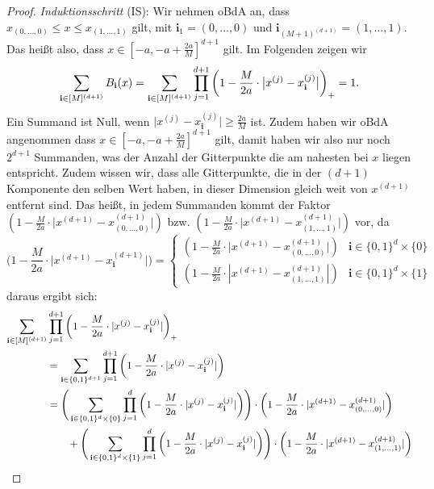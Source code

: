 \begin{proof}
\emph{Induktionsschritt} (IS): Wir nehmen oBdA an, dass $x_{(0,\dots,0)} \leq x \leq x_{(1,\dots,1)}$ gilt, mit $\mathbf{i}_1 = (0,\dots,0)$ und $\mathbf{i}_{(M + 1)^{(d + 1)}} = (1,\dots,1).$ Das heißt also, dass $x \in [-a, -a + \frac{2a}{M}]^{d + 1}$ gilt. Im Folgenden zeigen wir $$\sum_{\mathbf{i} \in [M]^{(d + 1)}} B_{\mathbf{i}}(x) = \sum_{\mathbf{i} \in [M]^{(d + 1)}}\prod_{j = 1}^{d + 1} \bigg(1 - \frac{M}{2a} \cdot \big|x^{(j)} - x_{\mathbf{i}}^{(j)}\big|\bigg)_+ = 1.$$
Ein Summand ist Null, wenn $\big|x^{(j)} - x_{\mathbf{i}}^{(j)}\big| \geq \frac{2a}{M}$ ist. Zudem haben wir oBdA angenommen dass $x \in [-a, -a + \frac{2a}{M}]^{d + 1}$ gilt, damit haben wir also nur noch $2^{d + 1}$ Summanden, was der Anzahl der Gitterpunkte die am nahesten bei $x$ liegen entspricht. Zudem wissen wir, dass alle Gitterpunkte, die in der $(d + 1)$ Komponente den selben Wert haben, in dieser Dimension gleich weit von $x^{(d + 1)}$ entfernt sind. Das heißt, in jedem Summanden kommt der Faktor $(1 - \frac{M}{2a} \cdot \big|x^{(d + 1)} - x_{(0,\dots,0)}^{(d + 1)}\big|)$ bzw. $(1 - \frac{M}{2a} \cdot \big|x^{(d + 1)} - x_{(1,\dots,1)}^{(d + 1)}\big|)$ vor, da 
\begin{equation*}
\bigg(1 - \frac{M}{2a} \cdot \Big|x^{(d + 1)} - x_\mathbf{i}^{(d + 1)}\Big|\bigg) = \begin{cases}
(1 - \frac{M}{2a} \cdot \big|x^{(d + 1)} - x_{(0,\dots,0)}^{(d + 1)}\big|) &\text{$\mathbf{i} \in \{0, 1\}^d \times \{0\}$}\\
(1 - \frac{M}{2a} \cdot |x^{(d + 1)} - x_{(1,\dots,1)}^{(d + 1)}|) &\text{$\mathbf{i} \in \{0, 1\}^d \times \{1\}$}
\end{cases}
\end{equation*}
daraus ergibt sich$\colon$
\begin{equation*}
\begin{split}
\sum_{\bi \in [M]^{(d + 1)}} & \prod_{j = 1}^{d + 1} \bigg(1 - \frac{M}{2a} \cdot |x^{(j)} - x_{\mathbf{i}}^{(j)}|\bigg)_+ \\
& = \sum_{\mathbf{i} \in \{0, 1\}^{d + 1}} \prod_{j = 1}^{d + 1} \bigg(1 - \frac{M}{2a} \cdot |x^{(j)} - x_{\bi}^{(j)}|\bigg) \\
& = \Bigg(\sum_{\mathbf{i} \in \{0, 1\}^d \times \{0\}} \prod_{j = 1}^{d} \bigg(1 - \frac{M}{2a} \cdot |x^{(j)} - x_{\bi}^{(j)}|\bigg)\Bigg) \cdot \bigg(1 - \frac{M}{2a} \cdot |x^{(d + 1)} - x_{(0,\dots,0)}^{(d + 1)}|\bigg) \\
& \qquad + \Bigg(\sum_{\mathbf{i} \in \{0, 1\}^d \times \{1\}} \prod_{j = 1}^{d} \bigg(1 - \frac{M}{2a} \cdot |x^{(j)} - x_{\bi}^{(j)}|\bigg)\Bigg) \cdot \bigg(1 - \frac{M}{2a} \cdot |x^{(d + 1)} - x_{(1,\dots,1)}^{(d + 1)}|\bigg) \\

\end{split}
\end{equation*}
\end{proof}
